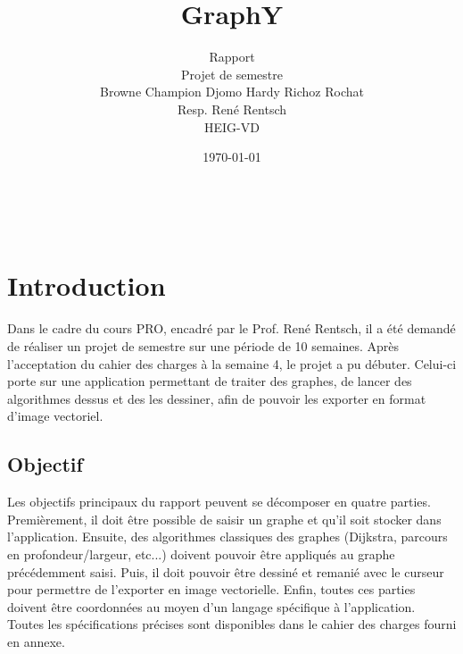 \documentclass[french]{article}
\begin{document}
	
	
	\title{GraphY} %
	\author{Rapport\\ 
		Projet de semestre\\
		Browne Champion Djomo Hardy Richoz Rochat\\
		Resp. René Rentsch\\
		HEIG-VD}
	\date{\today} %
	\maketitle
	\thispagestyle{empty}
	
	\newpage
	\thispagestyle{empty}
	$ $
	\newpage
	

	
	\tableofcontents
	

	
	\justify
	\normalsize
	
	\section{Introduction}
	Dans le cadre du cours PRO, encadré par le Prof. René Rentsch, il a été demandé de réaliser un projet de semestre sur une période de 10 semaines. Après l'acceptation du cahier des charges à la semaine 4, le projet a pu débuter. Celui-ci porte sur une application permettant de traiter des graphes, de lancer des algorithmes dessus et des les dessiner, afin de pouvoir les exporter en format d'image vectoriel.
	
		\subsection{Objectif}
		Les objectifs principaux du rapport peuvent se décomposer en quatre parties. Premièrement, il doit être possible de saisir un graphe et qu'il soit stocker dans l'application. Ensuite, des algorithmes classiques des graphes (Dijkstra, parcours en profondeur/largeur, etc...) doivent pouvoir être appliqués au graphe précédemment saisi. Puis, il doit pouvoir être dessiné et remanié avec le curseur pour permettre de l'exporter en image vectorielle. Enfin, toutes ces parties doivent être coordonnées au moyen d'un langage spécifique à l'application.\\
		Toutes les spécifications précises sont disponibles dans le cahier des charges fourni en annexe.
		
\end{document}
